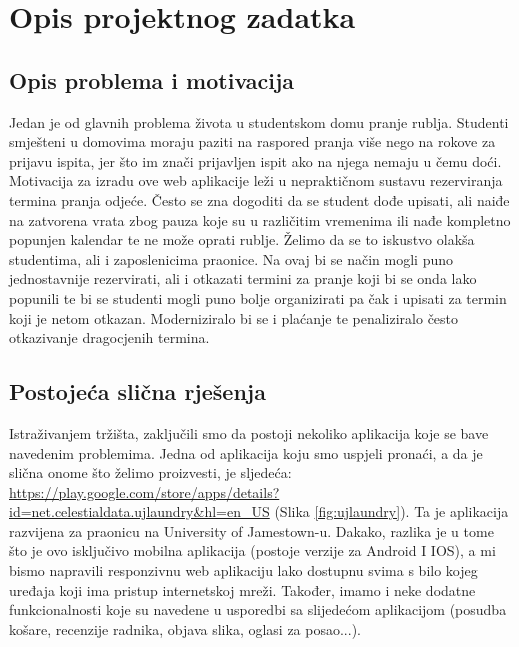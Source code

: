\chapter{Opis projektnog zadatka}
		
		\section{Opis problema i motivacija}
		
			{Jedan je od glavnih problema života u studentskom domu pranje rublja. Studenti smješteni u domovima
			moraju paziti na raspored pranja više nego na rokove za prijavu ispita, jer što im znači prijavljen ispit ako
			na njega nemaju u čemu doći. Motivacija za izradu ove web aplikacije leži u nepraktičnom sustavu
			rezerviranja termina pranja odjeće. Često se zna dogoditi da se student dođe upisati, ali naiđe na
			zatvorena vrata zbog pauza koje su u različitim vremenima ili nađe kompletno popunjen kalendar te ne
			može oprati rublje. Želimo da se to iskustvo olakša studentima, ali i zaposlenicima praonice. Na ovaj bi se
			način mogli puno jednostavnije rezervirati, ali i otkazati termini za pranje koji bi se onda lako popunili te
			bi se studenti mogli puno bolje organizirati pa čak i upisati za termin koji je netom otkazan.
			Moderniziralo bi se i plaćanje te penaliziralo često otkazivanje dragocjenih termina.}
		
		\section{Postojeća slična rješenja}
		
			{Istraživanjem tržišta, zaključili smo da postoji nekoliko aplikacija koje se bave navedenim problemima.
			Jedna od aplikacija koju smo uspjeli pronaći, a da je slična onome što želimo proizvesti, je sljedeća:
			\url{https://play.google.com/store/apps/details?id=net.celestialdata.ujlaundry&hl=en_US} (Slika  \ref{fig:ujlaundry}). Ta je aplikacija
			razvijena za praonicu na University of Jamestown-u. Dakako, razlika je u tome što je ovo isključivo
			mobilna aplikacija (postoje verzije za Android I IOS), a mi bismo napravili responzivnu web aplikaciju lako
			dostupnu svima s bilo kojeg uređaja koji ima pristup internetskoj mreži. Također, imamo i neke dodatne
			funkcionalnosti koje su navedene u usporedbi sa slijedećom aplikacijom (posudba košare, recenzije
			radnika, objava slika, oglasi za posao...).}
		
